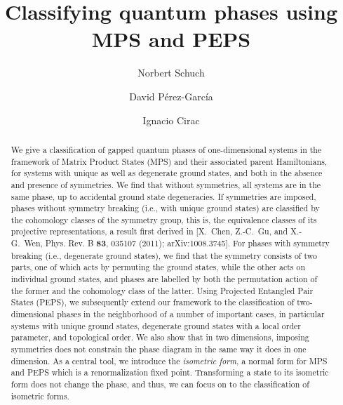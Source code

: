 \documentclass[twocolumn,superscriptaddress,prb,linenumbers]{revtex4-1}
\begin{document}
\nolinenumbers





\title{Classifying quantum phases using MPS and PEPS}
\author{Norbert Schuch}
\address{
    Institute for Quantum Information,
    California Institute of Technology,
    MC 305-16,
    Pasadena CA 91125, U.S.A.}
\author{David P\'erez-Garc\'ia}
\address{Dpto.\ Analisis Matematico and IMI,
    Universidad Complutense de Madrid, 28040 Madrid, Spain}
\author{Ignacio Cirac}
\address{Max-Planck-Institut f\"ur Quantenoptik, Hans-Kopfermann-Str.\ 1,
    D-85748 Garching, Germany}


\begin{abstract}
    We give a classification of gapped quantum phases of one-dimensional
    systems in the framework of Matrix Product States (MPS) and their
    associated parent Hamiltonians, for systems with unique as well as
    degenerate ground states, and both in the absence and presence of
    symmetries.  We find that without symmetries, all systems are in the same
    phase, up to accidental ground state degeneracies. If symmetries are
    imposed, phases without symmetry breaking (i.e., with unique ground
    states) are classified by the cohomology classes of the symmetry group,
    this is, the equivalence classes of its projective representations, a
    result first derived in [X.~Chen, Z.-C.~Gu, and X.-G.~Wen, Phys. Rev. B
            \textbf{83}, 035107 (2011); arXiv:1008.3745].  For phases with symmetry
    breaking (i.e., degenerate ground states), we find that the symmetry
    consists of two parts, one of which acts by permuting the ground states,
    while the other acts on individual ground states, and phases are labelled
    by both the permutation action of the former and the cohomology class of
    the latter.  Using Projected Entangled Pair States (PEPS), we subsequently
    extend our framework to the classification of two-dimensional phases in
    the neighborhood of a number of important cases, in particular systems
    with unique ground states, degenerate ground states with a local order
    parameter, and topological order.  We also show that in two dimensions,
    imposing symmetries does not constrain the phase diagram in the same way
    it does in one dimension.  As a central tool, we introduce the
    \emph{isometric form}, a normal form for MPS and PEPS which is a
    renormalization fixed point.  Transforming a state to its isometric form
    does not change the phase, and thus, we can focus on to the classification
    of isometric forms.
\end{abstract}
\end{document}
